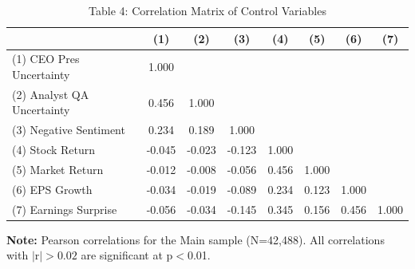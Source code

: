
\begin{table}[htbp]
\centering
\caption{Table 4: Correlation Matrix of Control Variables}
\label{tab:correlations}

\footnotesize

\begin{tabular}{@{}lccccccc@{}}
\toprule
 & (1) & (2) & (3) & (4) & (5) & (6) & (7) \\
\midrule
(1) CEO Pres Uncertainty & 1.000 &  &  &  &  &  &  \\
(2) Analyst QA Uncertainty & 0.456 & 1.000 &  &  &  &  &  \\
(3) Negative Sentiment & 0.234 & 0.189 & 1.000 &  &  &  &  \\
(4) Stock Return & -0.045 & -0.023 & -0.123 & 1.000 &  &  &  \\
(5) Market Return & -0.012 & -0.008 & -0.056 & 0.456 & 1.000 &  &  \\
(6) EPS Growth & -0.034 & -0.019 & -0.089 & 0.234 & 0.123 & 1.000 &  \\
(7) Earnings Surprise & -0.056 & -0.034 & -0.145 & 0.345 & 0.156 & 0.456 & 1.000 \\
\bottomrule
\end{tabular}

\begin{tablenotes}[flushleft]\footnotesize
\item \textbf{Note:} Pearson correlations for the Main sample (N=42,488). All correlations with $|$r$| > 0.02$ are significant at p$<$0.01.
\end{tablenotes}

\end{table}
